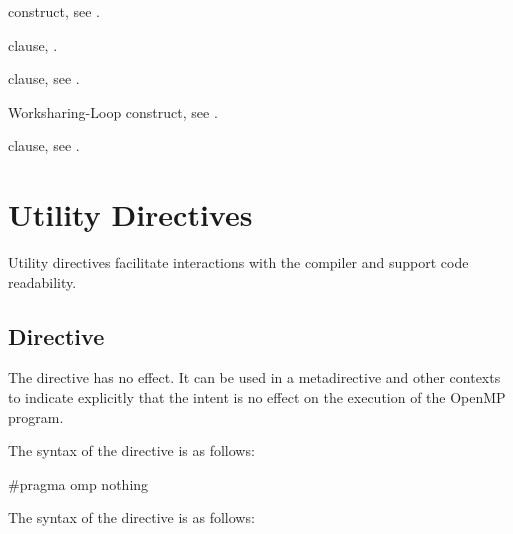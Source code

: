 \begin{crossrefs}
\item {} construct, see
.

\item {} clause,
.

\item {} clause, see
.

\item Worksharing-Loop construct, see
.

\item {} clause, see
.
\end{crossrefs}



\section{Utility Directives}
\label{sec:Utility Directives}

Utility directives facilitate interactions with the compiler 
and support code readability. 



\subsection{ Directive}
\label{subsec:nothing Directive}
\summary
The  directive has no effect. It can be used in a 
metadirective and other contexts to indicate explicitly that the
intent is no effect on the execution of the OpenMP program.

\syntax
\begin{ccppspecific}
\begin{samepage}
The syntax of the  directive is as follows:

\begin{ompcPragma}
#pragma omp nothing 
\end{ompcPragma}
\end{samepage}
\end{ccppspecific}

\begin{fortranspecific}
\begin{samepage}
The syntax of the  directive is as follows:

\end{samepage}
\end{fortranspecific}

